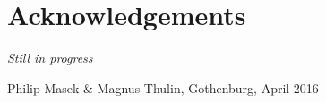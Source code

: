 \thispagestyle{plain}			%
\section*{Acknowledgements}
\textit{Still in progress}

\vspace{1.5cm}
\hfill
Philip Masek \& Magnus Thulin, Gothenburg, April 2016 \\

\newpage				%
\thispagestyle{empty}
\mbox{}